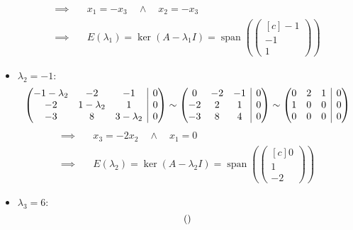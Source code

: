\documentclass[answers]{exam}
\makeatletter
\newenvironment{sysmatrix}[1]
  {\left(\begin{array}{@{}#1@{}}}
  {\end{array}\right)}
\newcommand{\vektor}[1]{\begin{pmatrix*}[c] #1 \end{pmatrix*}}
\makeatother
\begin{document}
\begin{questions}
\begin{solution}
\begin{itemize}
                  $$
                      \begin{aligned}
                          \implies \quad & x_1 = -x_3 \quad \land  \quad x_2 = -x_3                                    \\
                          \implies \quad & E(\lambda_1) = \ker(A - \lambda_1 I) = \operatorname{span}\left( \vektor{-1 \\ -1 \\ 1} \right)
                      \end{aligned}
                  $$
            \item $\lambda_2 = -1:$
                  $$
                      \begin{sysmatrix}{ccc|c}
                          -1 - \lambda_2 & -2 & -1 & 0 \\
                          -2 & 1 - \lambda_2 & 1 & 0 \\
                          -3 & 8 & 3 - \lambda_2 & 0
                      \end{sysmatrix}
                      \sim
                      \begin{sysmatrix}{ccc|c}
                          0 & -2 & -1 & 0 \\
                          -2 & 2 & 1 & 0 \\
                          -3 & 8 & 4 & 0
                      \end{sysmatrix}
                      \sim
                      \begin{sysmatrix}{ccc|c}
                          0 & 2 & 1 & 0 \\
                          1 & 0 & 0 & 0 \\
                          0 & 0 & 0 & 0
                      \end{sysmatrix}
                  $$
                  $$
                      \begin{aligned}
                          \implies \quad & x_3 = -2x_2 \quad \land  \quad x_1 = 0                                     \\
                          \implies \quad & E(\lambda_2) = \ker(A - \lambda_2 I) = \operatorname{span}\left( \vektor{0 \\ 1 \\ -2} \right)
                      \end{aligned}
                  $$
            \item $\lambda_3 = 6:$
                  $$
                      \begin{sysmatrix}{ccc|c}

\end{sysmatrix}$$
\end{itemize}
\end{solution}
\end{questions}
\end{document}
